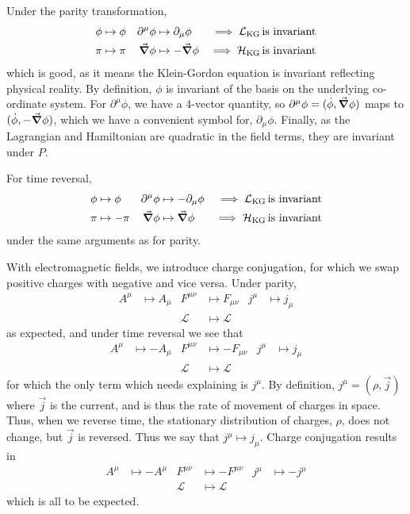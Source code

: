 \documentclass[notes.tex]{subfiles}
\begin{document}
Under the parity transformation,
\begin{align*}
 \phi &\mapsto \phi &\partial^\mu \phi &\mapsto \partial_\mu \phi & \implies \mathcal{L}_{\mathrm{KG}}\,& \textrm{is invariant}\\
 \pi &\mapsto \pi & \grad\phi &\mapsto -\grad\phi &\implies \mathcal{H}_{\mathrm{KG}}\,& \textrm{is invariant}
\end{align*}
which is good, as it means the Klein-Gordon equation is invariant reflecting physical reality.
By definition, $\phi$ is invariant of the basis on the underlying co-ordinate system. For $\partial^\mu \phi$, we have a 4-vector quantity, so $\partial^\mu \phi = (\dot\phi, \grad\phi)$ maps to $(\dot\phi, -\grad\phi)$, which we have a convenient symbol for, $\partial_\mu \phi$. Finally, as the Lagrangian and Hamiltonian are quadratic in the field terms, they are invariant under $P$.

For time reversal,
\begin{align*}
  \phi &\mapsto \phi &\partial^\mu \phi &\mapsto -\partial_\mu \phi & \implies \mathcal{L}_{\mathrm{KG}}\,& \textrm{is invariant}\\
  \pi &\mapsto -\pi & \grad\phi &\mapsto \grad\phi &\implies \mathcal{H}_{\mathrm{KG}}\,& \textrm{is invariant}
\end{align*}
under the same arguments as for parity.

With electromagnetic fields, we introduce charge conjugation, for which we swap positive charges with negative and vice versa.
Under parity,
\begin{align*}
  A^\mu &\mapsto A_\mu & F^{\mu\nu} &\mapsto F_{\mu\nu} & j^\mu & \mapsto j_\mu\\
  && \mathcal{L} & \mapsto \mathcal{L}
\end{align*}
as expected, and under time reversal we see that
\begin{align*}
  A^\mu &\mapsto -A_\mu & F^{\mu\nu} &\mapsto -F_{\mu\nu} & j^\mu & \mapsto j_\mu\\
  && \mathcal{L} & \mapsto \mathcal{L}
\end{align*}
for which the only term which needs explaining is $j^\mu$.
By definition, $j^\mu = (\rho, \vec{j})$ where $\vec{j}$ is the current, and is thus the rate of movement of charges in space. Thus, when we reverse time, the stationary distribution of charges, $\rho$, does not change, but $\vec{j}$ is reversed. Thus we say that $j^\mu \mapsto j_\mu$.
Charge conjugation results in 
\begin{align*}
  A^\mu &\mapsto -A^\mu & F^{\mu\nu} &\mapsto -F^{\mu\nu} & j^\mu &\mapsto -j^\mu\\
  && \mathcal{L} &\mapsto \mathcal{L}
\end{align*}
which is all to be expected. 
\end{document}
